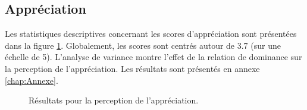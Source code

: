 	\subsection{Appréciation}
	Les statistiques descriptives concernant les scores d’appréciation sont présentées dans la figure \ref{fig:app}. Globalement,
	les scores sont centrés autour de 3.7 (sur une échelle de 5). L'analyse de variance montre l'effet de la relation de dominance sur la perception de l'appréciation. Les résultats sont présentés en annexe \ref{chap:Annexe}.
	
	\begin{figure}[h]
		
		
		\caption{Résultats pour la perception de l'appréciation.}
		\label{fig:app}
	\end{figure}
	
